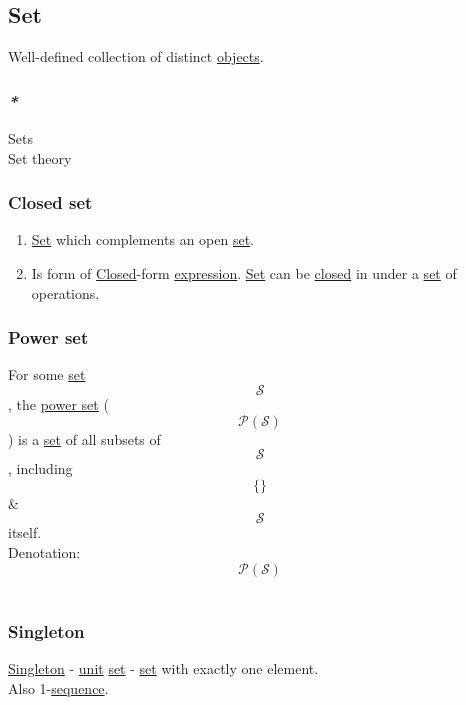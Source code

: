 \documentclass[11pt]{article}
\begin{document}
\subsection{\label{org1faf06d}Set}
\label{sec:orge877b28}
Well-defined collection of distinct \hyperref[org363acc2]{objects}.\\

\subsubsection{\emph{*}}
\label{sec:org7530f4a}

\label{org58ec608}Sets\\
\label{org1cc9425}Set theory\\

\subsubsection{\label{org7bd2552}Closed set}
\label{sec:org205a711}
\begin{enumerate}
\item \hyperref[org1faf06d]{Set} which complements an open \hyperref[org1faf06d]{set}.\\

\item Is form of \hyperref[orgcdd7006]{Closed}-form \hyperref[org9021dd7]{expression}. \hyperref[org1faf06d]{Set} can be \hyperref[orgcdd7006]{closed} in under a \hyperref[org1faf06d]{set} of operations.\\
\end{enumerate}

\subsubsection{\label{org8dd7cb1}Power set}
\label{sec:org5a94467}
For some \hyperref[org1faf06d]{set} $$ \mathcal{S} $$, the \hyperref[org8dd7cb1]{power set} ($$ \mathcal{P(S)} $$) is a \hyperref[org1faf06d]{set} of all subsets of $$ \mathcal{S} $$, including $$ \{\} $$ \& $$ \mathcal{S} $$ itself.\\

Denotation:\\
$$ \mathcal{P(S)} $$\\

\subsubsection{\label{org2bdbd3e}Singleton}
\label{sec:org113c1f1}
\hyperref[org2bdbd3e]{Singleton} - \hyperref[org0b3ee46]{unit} \hyperref[org1faf06d]{set} - \hyperref[org1faf06d]{set} with exactly one element.\\
Also 1-\hyperref[org522d1b0]{sequence}.\\
\end{document}
